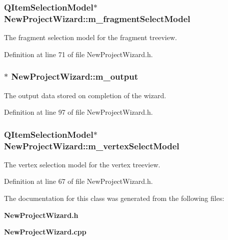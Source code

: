 \subsubsection[{m\-\_\-fragment\-Select\-Model}]{\setlength{\rightskip}{0pt plus 5cm}Q\-Item\-Selection\-Model$\ast$ New\-Project\-Wizard\-::m\-\_\-fragment\-Select\-Model}\label{class_new_project_wizard_aa065668ee318d83657fceeb95bc67522}


The fragment selection model for the fragment treeview. 



Definition at line 71 of file New\-Project\-Wizard.\-h.

\subsubsection[{m\-\_\-output}]{$\ast$ New\-Project\-Wizard\-::m\-\_\-output\hspace{0.3cm}{\ttfamily [private]}}\label{class_new_project_wizard_a8610be87786026af865ab432c021007c}


The output data stored on completion of the wizard. 



Definition at line 97 of file New\-Project\-Wizard.\-h.

\subsubsection[{m\-\_\-vertex\-Select\-Model}]{\setlength{\rightskip}{0pt plus 5cm}Q\-Item\-Selection\-Model$\ast$ New\-Project\-Wizard\-::m\-\_\-vertex\-Select\-Model}\label{class_new_project_wizard_ac544a8f59b0e5554ee4d18fa8f05b3ff}


The vertex selection model for the vertex treeview. 



Definition at line 67 of file New\-Project\-Wizard.\-h.



The documentation for this class was generated from the following files\-:\begin{DoxyCompactItemize}
\item 
{\bf New\-Project\-Wizard.\-h}\item 
{\bf New\-Project\-Wizard.\-cpp}\end{DoxyCompactItemize}

